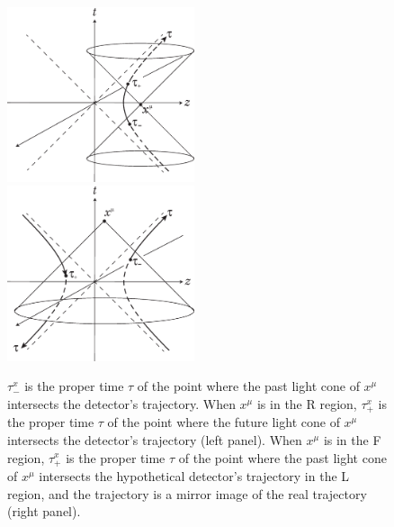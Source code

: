 \documentclass[aps,prd,preprintnumbers,nofootinbib,showpacs]{revtex4}%
\begin{document}
\begin{widetext}
\begin{figure}[t]
\begin{center}
    \includegraphics[width=5.5cm]{fig6a.eps}
~~~~~~~~~~~~~~~~~~~~~~
    \includegraphics[width=5.5cm]{fig6b.eps}
\caption{$\tau_-^x$ is the
proper time $\tau$ of the point where the past light cone of $x^\mu$ intersects 
the detector's trajectory. 
When $x^\mu$ is in the R region, $\tau_+^x$ is the proper time $\tau$ of the 
point where the future light cone of 
$x^\mu$ intersects the detector's trajectory (left panel). 
When $x^\mu$ is in the F region, $\tau_+^x$ is the proper time $\tau$ of the 
point where the past light cone of 
$x^\mu$ intersects the hypothetical detector's trajectory in the L region, and the trajectory is
a mirror image of the real trajectory (right panel). 
\label{fig:taupm}
}
\end{center}
\end{figure}


\end{widetext}
\end{document}
